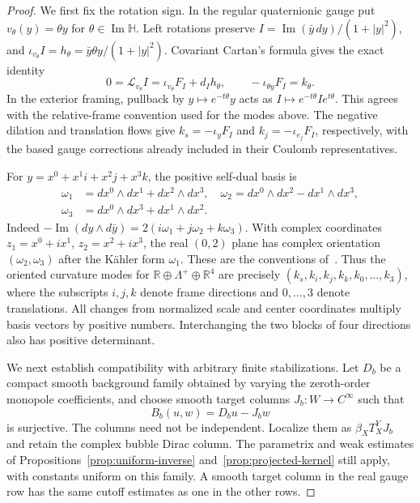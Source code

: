 \documentclass[11pt]{amsart}
\theoremstyle{definition}
\theoremstyle{remark}
\theoremstyle{plain}
\newcommand{\RR}{\mathbb{R}}
\begin{document}
\begin{proof}
We first fix the rotation sign.  In the regular quaternionic gauge put
$v_\theta(y)=\theta y$ for $\theta\in\operatorname{Im}\mathbb H$.
Left rotations preserve
$I=\operatorname{Im}(\bar y\,dy)/(1+|y|^2)$, and
$\iota_{v_\theta}I=h_\theta=\bar y\theta y/(1+|y|^2)$.
Covariant Cartan's formula gives the exact identity
\begin{equation}\label{eq:rotation-contraction-orientation}
 0=\mathcal L_{v_\theta}I
   =\iota_{v_\theta}F_I+d_Ih_\theta,
 \qquad -\iota_{\theta y}F_I=k_\theta.
\end{equation}
In the exterior framing, pullback by $y\mapsto e^{-t\theta}y$
acts as $I\mapsto e^{-t\theta}Ie^{t\theta}$.  This agrees with the
relative-frame convention used for the modes above.  The negative
dilation and translation flows give $k_s=-\iota_yF_I$ and
$k_j=-\iota_{e_j}F_I$, respectively, with the based gauge corrections
already included in their Coulomb representatives.

For $y=x^0+x^1i+x^2j+x^3k$, the positive self-dual basis is
\begin{align*}
 \omega_1&=dx^0\wedge dx^1+dx^2\wedge dx^3,\quad
 \omega_2=dx^0\wedge dx^2-dx^1\wedge dx^3,\\
 \omega_3&=dx^0\wedge dx^3+dx^1\wedge dx^2.
\end{align*}
Indeed $-\operatorname{Im}(dy\wedge d\bar y)
=2(i\omega_1+j\omega_2+k\omega_3)$.  With complex coordinates
$z_1=x^0+ix^1$, $z_2=x^2+ix^3$, the real $(0,2)$ plane has complex
orientation $(\omega_2,\omega_3)$ after the K\"ahler form $\omega_1$.
These are the conventions of~\cite[Section~3(c), p.~413]{DonaldsonOrientation}.
Thus the oriented curvature modes for
$\RR\oplus\Lambda^+\oplus\RR^4$ are precisely
$(k_s,k_i,k_j,k_k,k_0,\ldots,k_3)$, where the subscripts $i,j,k$
denote frame directions and $0,\ldots,3$ denote translations.
All changes from normalized scale and center coordinates multiply
basis vectors by positive numbers.  Interchanging the two blocks of
four directions also has positive determinant.

We next establish compatibility with arbitrary finite stabilizations.
Let $D_b$ be a compact smooth background family obtained by varying
the zeroth-order monopole coefficients, and choose smooth target
columns $J_b:W\to C^\infty$ such that
\begin{equation}\label{eq:general-orientation-augmentation}
 B_b(u,w)=D_bu-J_bw
\end{equation}
is surjective.  The columns need not be independent.  Localize them
as $\beta_XT_X^YJ_b$ and retain the complex bubble Dirac column.
The parametrix and weak estimates of
Propositions~\ref{prop:uniform-inverse} and~\ref{prop:projected-kernel}
still apply, with constants uniform on this family.  A smooth target
column in the real gauge row has the same cutoff estimates as one
in the other rows.


\end{proof}
\end{document}
